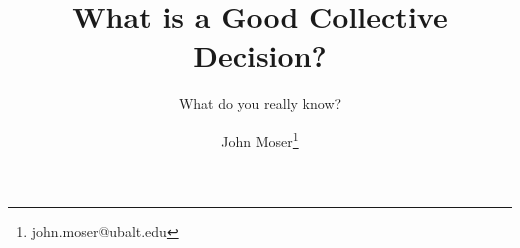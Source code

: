 \documentclass[twoside,notitlepage,12pt,appendixprefix=true]{scrartcl}
\begin{document}
    \author{John Moser\thanks{john.moser@ubalt.edu}}

    \title{What is a Good Collective Decision?}
    \subtitle{What do you really know?}
    \maketitle

    
    \FloatBarrier
    \printbibliography
\end{document}
